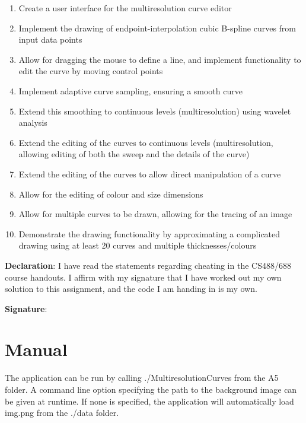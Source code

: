 \documentclass[11pt]{article}
\begin{document}
\begin{enumerate}
\item Create a user interface for the multiresolution curve editor
\item Implement the drawing of endpoint-interpolation cubic B-spline curves from input data points
\item Allow for dragging the mouse to define a line, and implement functionality to edit the curve by moving control points
\item Implement adaptive curve sampling, ensuring a smooth curve
\item Extend this smoothing to continuous levels (multiresolution) using wavelet analysis
\item Extend the editing of the curves to continuous levels (multiresolution, allowing editing of both the sweep and the details of the curve)
\item Extend the editing of the curves to allow direct manipulation of a curve
\item Allow for the editing of colour and size dimensions
\item Allow for multiple curves to be drawn, allowing for the tracing of an image
\item Demonstrate the drawing functionality by approximating a complicated drawing using at least 20 curves and multiple thicknesses/colours
\end{enumerate}

\begin{flushleft}
\textbf{Declaration}: I have read the statements regarding cheating in the CS488/688 course handouts. I affirm with my signature that I have worked out my own solution to this assignment, and the code I am handing in is my own.
\end{flushleft}

\begin{flushleft}
\textbf{Signature}:
\end{flushleft}

\newpage

\section{Manual}
\label{sec:manual}
The application can be run by calling ./MultiresolutionCurves from the A5 folder. A command line option specifying the path to the background image can be given at runtime. If none is specified, the application will automatically load img.png from the ./data folder.
\end{document}
